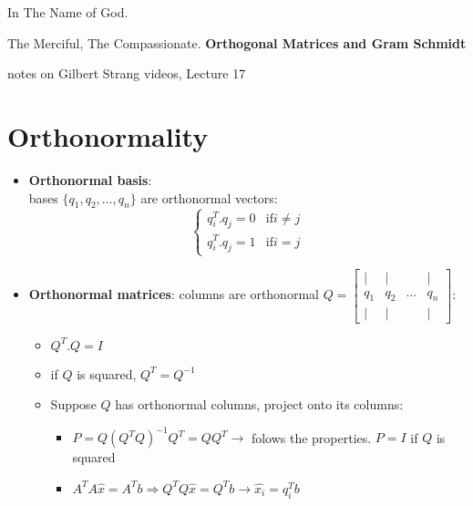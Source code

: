 \documentclass[a4paper,12pt]{article}
\begin{document}
\begin{center}
In The Name of God.

The Merciful, The Compassionate.
\vskip 1cm
{\Large\bfseries{Orthogonal Matrices and Gram Schmidt}}

\vskip 0.2cm
\tiny{notes on Gilbert Strang videos, Lecture 17}
\end{center}

\section{Orthonormality}
\begin{itemize}
\item \textbf{Orthonormal basis}: \\
bases $\{q_1, q_2,\ldots,q_n\}$ are orthonormal vectors:\\

\begin{equation*}
\left\{\begin{array}{rl}
q_i^T.q_j = 0 & \text{if} i \neq j \\
q_i^T.q_j = 1 & \text{if} i = j
\end{array}
\right.
\end{equation*}

\item \textbf{Orthonormal matrices}: columns are orthonormal 
$Q = 
\begin{bmatrix}
\mid & \mid &        & \mid \\
q_1  & q_2  & \ldots & q_n \\
\mid & \mid &        & \mid
\end{bmatrix}
$:
\begin{itemize}
\item $Q^T.Q = I$
\item if $Q$ is squared, $Q^T = Q^{-1}$
\item Suppose $Q$ has orthonormal columns, project onto its columns:
\begin{itemize}
\item $P = Q(Q^T Q)^{-1} Q^T = Q Q^T \rightarrow$ folows the properties. $P = I$ if $Q$ is squared

\item $A^T A \hat{x} = A^T b \Rightarrow Q^T Q\hat{x} = Q^T b \rightarrow \hat{x_i} = q_i^Tb$ 
\end{itemize}
\end{itemize}

\end{itemize}
\end{document}

